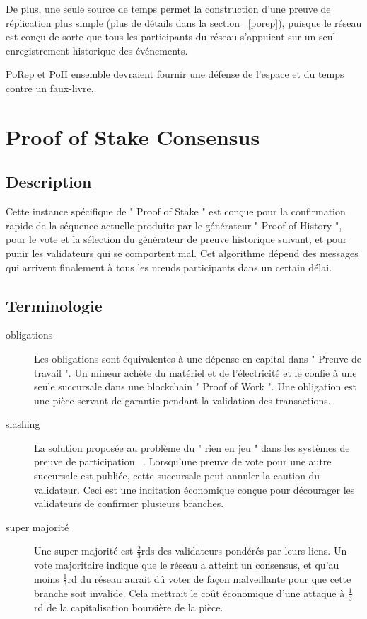 \documentclass[12pt]{article}
\begin{document}
De plus, une seule source de temps permet la construction d'une preuve de réplication plus simple (plus de détails dans la section ~\ref{porep}), puisque le réseau est conçu de sorte que tous les participants du réseau s'appuient sur un seul enregistrement historique des événements.

PoRep et PoH ensemble devraient fournir une défense de l'espace et du temps contre un faux-livre.


\section{Proof of Stake Consensus}\label{proof_of_stake}
\subsection{Description}
Cette instance spécifique de " Proof of Stake " est conçue pour la confirmation rapide de la séquence actuelle produite par le générateur " Proof of History ", pour le vote et la sélection du générateur de preuve historique suivant, et pour punir les validateurs qui se comportent mal. Cet algorithme dépend des messages qui arrivent finalement à tous les nœuds participants dans un certain délai.
\subsection{Terminologie}
\begin{description}

\item[obligations]
Les obligations sont équivalentes à une dépense en capital dans " Preuve de travail ". Un mineur achète du matériel et de l'électricité et le confie à une seule succursale dans une blockchain " Proof of Work ". Une obligation est une pièce servant de garantie pendant la validation des transactions.

\item[slashing]

La solution proposée au problème du " rien en jeu " dans les systèmes de preuve de participation ~\cite{slasher}. Lorsqu'une preuve de vote pour une autre succursale est publiée, cette succursale peut annuler la caution du validateur. Ceci est une incitation économique conçue pour décourager les validateurs de confirmer plusieurs branches.
\item[super majorité]
Une super majorité est \(\frac{2}{3}\)rds des validateurs pondérés par leurs liens. Un vote majoritaire indique que le réseau a atteint un consensus, et qu'au moins \(\frac{1}{3}\)rd du réseau aurait dû voter de façon malveillante pour que cette branche soit invalide. Cela mettrait le coût économique d'une attaque à \(\frac{1}{3}\)rd de la capitalisation boursière de la pièce.

\end{description}
\end{document}
